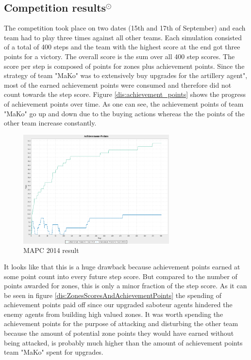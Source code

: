 \subsection{Competition results$^\odot$}
The competition took place on two dates (15th and 17th of September) and each team had to play three times against all other teams. Each simulation consisted of a total of 400 steps and the team with the highest score at the end got three points for a victory. The overall score is the sum over all 400 step scores. The score per step is composed of points for zones plus achievement points. Since the strategy of team "MaKo" was to extensively buy upgrades for the artillery agent", most of the earned achievement points were consumed and therefore did not count towards the step score. Figure \autoref{dis:achievement_points} shows the progress of achievement points over time. As one can see, the achievement points of team "MaKo" go up and down due to the buying actions whereas the the points of the other team increase constantly. 
\begin{figure}[ht]
	\centering
	\includegraphics[width=300px]{images/AchievementPoints.png}
	\caption{MAPC 2014 result}
	\label{dis:achievement_points}
\end{figure}
It looks like that this is a huge drawback because achievement points earned at some point count into every future step score. But compared to the number of points awarded for zones, this is only a minor fraction of the step score. As it can be seen in figure \autoref{dis:ZonesScoresAndAchievementPoints} the spending of achievement points paid off since our upgraded saboteur agents hindered the enemy agents from building high valued zones. It was worth spending the achievement points for the purpose of attacking and disturbing the other team because the amount of potential zone points they would have earned without being attacked, is probably much higher than the amount of achievement points team "MaKo" spent for upgrades.
